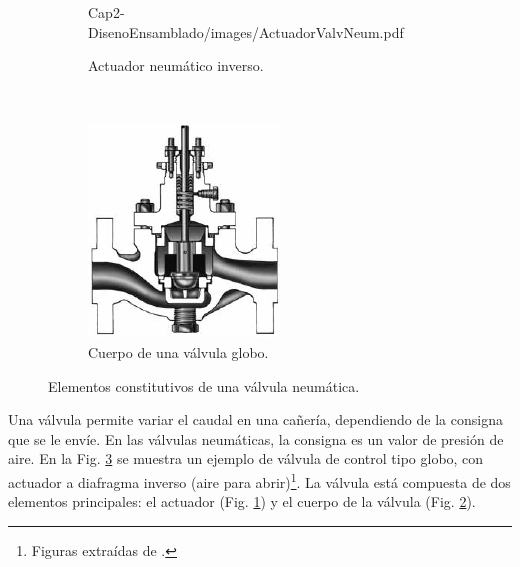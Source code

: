 \begin{figure}[ht]
\begin{subfigure}[b]{0.36\textwidth}
	{Cap2-DisenoEnsamblado/images/ActuadorValvNeum.pdf}
                \caption{Actuador neumático inverso.}
                \label{fig:actuadorValv}
        \end{subfigure}%
        ~
        \begin{subfigure}[b]{0.36\textwidth}
\includegraphics[width=\textwidth]{Cap2-DisenoEnsamblado/images/ValvGlob.pdf}
                \caption{Cuerpo de una válvula globo.}
                \label{fig:cuerpoValv}
        \end{subfigure}
        \caption{Elementos constitutivos de una válvula neumática.}
        \label{fig:elementosValv}
\end{figure}

Una válvula permite variar el caudal en una cañería, dependiendo de la consigna
que se le envíe.
En las válvulas neumáticas, la consigna es un valor de presión de aire.
En la Fig. \ref{fig:elementosValv} se muestra un ejemplo de válvula de control
tipo globo, con actuador a diafragma inverso (aire para
abrir)\footnote{Figuras extraídas de \cite{bib:controlValveHandbook}.}.
La válvula está compuesta de dos elementos principales: el actuador
(Fig. \ref{fig:actuadorValv}) y el cuerpo de la válvula (Fig.
\ref{fig:cuerpoValv}).

